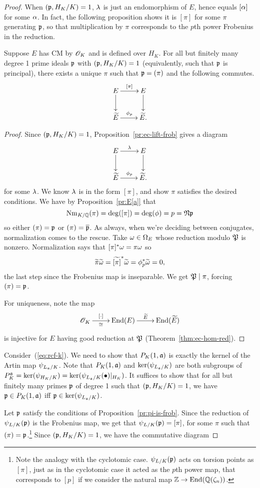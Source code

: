 \begin{proof}
 When $(\mathfrak{p},H_K/K)=1$, $\lambda$ is just an endomorphism of $E$, hence equals $[\alpha]$ for some $\alpha$. In fact, the following proposition shows it is $[\pi]$ for some $\pi$ generating $\mathfrak{p}$, so that multiplication by $\pi$ corresponds to the $p$th power Frobenius in the reduction.
\begin{pr}
Suppose $E$ has CM by $\mathscr{O}_K$ and is defined over $H_K$. For all but finitely many degree 1 prime ideals $\mathfrak{p}$ with $(\mathfrak{p},H_K/K)=1$ (equivalently, such that $\mathfrak{p}$ is principal), there exists a unique $\pi$ such that $\mathfrak{p}=(\pi)$ and the following commutes.
\[
\xymatrix{
E\ar[r]^{[\pi]} \ar[d] &E \ar[d]\\
\wt E\ar[r]^{\phi_p} & \wt E.
}
\]
\end{pr}
\begin{proof}
Since $(\mathfrak{p},H_K/K)=1$, Proposition~\ref{pr:ec-lift-frob} gives a diagram
\[
\xymatrix{
E\ar[r]^{\la} \ar[d] &E \ar[d]\\
\wt E\ar[r]^{\phi_p} & \wt E.
}
\]
for some $\lambda$. We know $\lambda$ is in the form $[\pi]$, and show $\pi$ satisfies the desired conditions. We have by Proposition~\ref{pr:E[a]} that
\[
\operatorname{Nm}_{K/\mathbb{Q}}(\pi)=\deg([\pi])=\deg(\phi)=p=\mathfrak{N}\mathfrak{p}
\]
so either $(\pi)=\mathfrak{p}$ or $(\pi)=\overline{\mathfrak{p}}$. As always, when we're deciding between conjugates, normalization comes to the rescue. Take $\omega\in \Omega_E$ whose reduction modulo $\mathfrak{P}$ is nonzero. Normalization says that $[\pi]^*\omega=\pi \omega$ so
\[
\widetilde{\pi}\widetilde{\omega}=\widetilde{[\pi]}^*\widetilde{\omega}=\phi_p^*\widetilde{\omega}=0,
\]
the last step since the Frobenius map is inseparable. We get $\mathfrak{P}\mid \pi$, forcing $(\pi)=\mathfrak{p}$.

For uniqueness, note the map
\[
\xymatrix{
\sO_K\ar[r]^-{[\cdot]}_-{\cong}& \End(E)\ar[r]^{\wt{E}} &\End(\wt E)
}
\]
is injective for $E$ having good reduction at $\mathfrak{P}$ (Theorem~\ref{thm:ec-hom-red}).
\end{proof}

 Consider~(\ref{eq:rcf-k}). We need to show that $P_K(1,\mathfrak{a})$ is exactly the kernel of the Artin map $\psi_{L_{\mathfrak{a}}/K}$. 
Note that $P_K(1,\mathfrak{a})$ and $\ker(\psi_{L_{\mathfrak{a}}/K})$ are both subgroups of $P_K^{\mathfrak{a}}=\ker(\psi_{H_K/K})=\ker(\psi_{L_{\mathfrak{a}}/K}(\bullet)|_{H_K})$. It suffices to show that for all but finitely many primes $\mathfrak{p}$ of degree 1 such that $(\mathfrak{p},H_K/K)=1$, we have $\mathfrak{p}\in P_K(1,\mathfrak{a})$ iff $\mathfrak{p}\in \ker(\psi_{L_{\mathfrak{a}}/K})$.

Let $\mathfrak{p}$ satisfy the conditions of Proposition~\ref{pr:pi-is-frob}. Since the reduction of $\psi_{L/K}(\mathfrak{p})$ is the Frobenius map, we get that $\psi_{L/K}(\mathfrak{p})=[\pi]$, for some $\pi$ such that $(\pi)=\mathfrak{p}$.\footnote{Note the analogy with the cyclotomic case. $\psi_{L/K}(\mathfrak{p})$ acts on torsion points as $[\pi]$, just as in the cyclotomic case it acted as the $p$th power map, that corresponds to $[p]$ if we consider the natural map $\mathbb{Z}\to \operatorname{End}(\mathbb{Q}(\zeta_n))$.} Since $(\mathfrak{p},H_K/K)=1$, we have the commutative diagram
\eeq


\end{proof}
